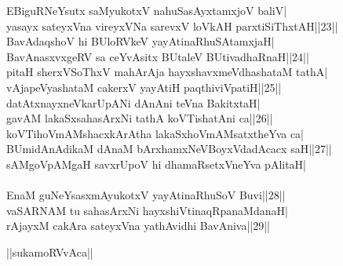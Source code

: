 \documentclass{article}
\begin{document}
EBiguRNeYsutx saMyukotxV nahuSasAyxtamxjoV baliV|\\
yasayx sateyxVna vireyxVNa sarevxV loVkAH parxtiSiThxtAH||23||\\
BavAdaqshoV hi BUloRVkeV yayAtinaRhuSAtamxjaH|\\
BavAnasxvxgeRV sa ceYvAsitx BUtaleV BUtivadhaRnaH||24||\\
pitaH sherxVSoThxV mahArAja hayxshavxmeVdhashataM tathA|\\
vAjapeVyashataM cakerxV yayAtiH paqthiviVpatiH||25||\\
datAtxnayxneVkarUpANi dAnAni teVna BakitxtaH|\\
gavAM lakaSxsahasArxNi tathA koVTishatAni ca||26||\\
koVTihoVmAMshacxkArAtha lakaSxhoVmAMsatxtheYva ca|\\
BUmidAnAdikaM dAnaM bArxhamxNeVBoyxVdadAcacx saH||27||\\
sAMgoVpAMgaH savxrUpoV hi dhamaRsetxVneYva pAlitaH|\\\\
EnaM guNeYsasxmAyukotxV yayAtinaRhuSoV Buvi||28||\\
vaSARNAM tu sahasArxNi hayxshiVtinaqRpanaMdanaH|\\
rAjayxM cakAra sateyxVna yathAvidhi BavAniva||29||\\

\begin{center}
||sukamoRVvAca||
\end{center}
\end{document}
